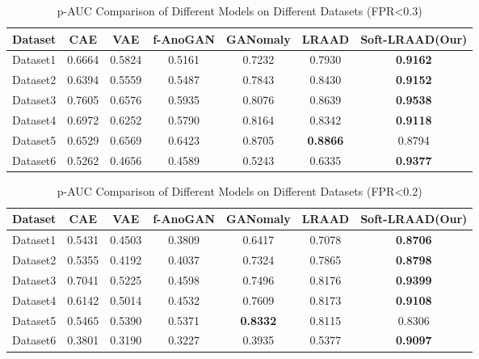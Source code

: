 \documentclass{article}
\begin{document}
\begin{table}[H]
    \centering
    \caption{p-AUC Comparison of Different Models on Different Datasets (FPR<0.3)}
    \begin{tabular}{ccccccc}
        \toprule
        Dataset & CAE & VAE & f-AnoGAN & GANomaly & LRAAD & Soft-LRAAD(Our) \\
        \midrule
        Dataset1 & 0.6664 & 0.5824 & 0.5161 & 0.7232 & 0.7930 & \textbf{0.9162} \\
        Dataset2 & 0.6394 & 0.5559 & 0.5487 & 0.7843 & 0.8430 & \textbf{0.9152} \\
        Dataset3 & 0.7605 & 0.6576 & 0.5935 & 0.8076 & 0.8639 & \textbf{0.9538} \\
        Dataset4 & 0.6972 & 0.6252 & 0.5790 & 0.8164 & 0.8342 & \textbf{0.9118} \\
        Dataset5 & 0.6529 & 0.6569 & 0.6423 & 0.8705 & \textbf{0.8866} & 0.8794 \\
        Dataset6 & 0.5262 & 0.4656 & 0.4589 & 0.5243 & 0.6335 & \textbf{0.9377} \\
        \bottomrule
    \end{tabular}
    \label{tab:p-auc-03}
\end{table}

\begin{table}[H]
    \centering
    \caption{p-AUC Comparison of Different Models on Different Datasets (FPR<0.2)}
    \begin{tabular}{ccccccc}
        \toprule
        Dataset & CAE & VAE & f-AnoGAN & GANomaly & LRAAD & Soft-LRAAD(Our) \\
        \midrule
        Dataset1 & 0.5431 & 0.4503 & 0.3809 & 0.6417 & 0.7078 & \textbf{0.8706} \\
        Dataset2 & 0.5355 & 0.4192 & 0.4037 & 0.7324 & 0.7865 & \textbf{0.8798} \\
        Dataset3 & 0.7041 & 0.5225 & 0.4598 & 0.7496 & 0.8176 & \textbf{0.9399} \\
        Dataset4 & 0.6142 & 0.5014 & 0.4532 & 0.7609 & 0.8173 & \textbf{0.9108} \\
        Dataset5 & 0.5465 & 0.5390 & 0.5371 & \textbf{0.8332} & 0.8115 & 0.8306 \\
        Dataset6 & 0.3801 & 0.3190 & 0.3227 & 0.3935 & 0.5377 & \textbf{0.9097} \\
        \bottomrule
    \end{tabular}
    \label{tab:p-auc-02}
\end{table}
\end{document}
